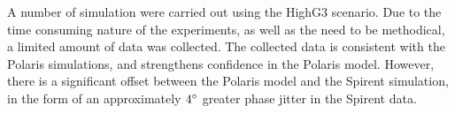 A number of simulation were carried out using the HighG3 scenario. Due to the time consuming nature of the experiments, as well as the need to be methodical, a limited amount of data was collected. The collected data is consistent with the Polaris simulations, and strengthens confidence in the Polaris model. However, there is a significant offset between the Polaris model and the Spirent simulation, in the form of an approximately $4\degree$ greater phase jitter in the Spirent data. 


\begin{comment}
\begin{table}[!htb]
\centering
\begin{tabular}{|l|l|l|}
\hline
\rowcolor[HTML]{C0C0C0} 
Channel number & Satellite number & Phase jitter       \\ \hline
0              & 3                & 7.09 \\ \hline
\rowcolor[HTML]{EFEFEF} 
1              & 6                & 7.18 \\ \hline
2              & 11               & 7.11 \\ \hline
\rowcolor[HTML]{EFEFEF} 
3              & 14               & 7.12 \\ \hline
4              & 16               & 6.87 \\ \hline
\rowcolor[HTML]{EFEFEF} 
5              & 18               & 5.68 \\ \hline
6              & 19               & 7.14  \\ \hline
\rowcolor[HTML]{EFEFEF} 
7              & 22               & 7.15 \\ \hline
\end{tabular}
\caption{CNO = 48,PLLBW =32,FLL=0}
\label{my-label}
\end{table}




\begin{table}[!htb]
\centering
\begin{tabular}{|l|l|l|}
\hline
\rowcolor[HTML]{C0C0C0} 
Channel number & Satellite number & Phase jitter       \\ \hline
0              & 14               & 5.37 \\ \hline
\rowcolor[HTML]{EFEFEF} 
1              & 3                & 9.16 \\ \hline
2              & 6                & 9.21 \\ \hline
\rowcolor[HTML]{EFEFEF} 
3              & 18               & 9.35 \\ \hline
4              & 11               & 9.11 \\ \hline
\rowcolor[HTML]{EFEFEF} 
5              & 16               & 9.06 \\ \hline
6              & 19               & 9.07 \\ \hline
\rowcolor[HTML]{EFEFEF} 
7              & 22               & 7.89 \\ \hline
\end{tabular}
\caption{CNO = 42,PLLBW =32,FLL=0}
\label{my-label}
\end{table}
\end{comment}


